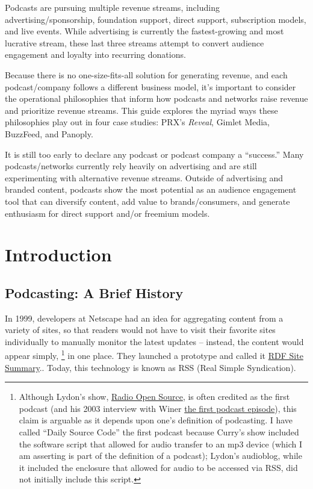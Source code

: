 \documentclass[notoc, symmetric, nobib, nols]{towcenter-guideto-book}
\begin{document}
Podcasts are pursuing multiple revenue streams, including advertising/sponsorship, foundation support, direct support, subscription models, and live events. While advertising is currently the fastest-growing and most lucrative stream, these last three streams attempt to convert audience engagement and loyalty into recurring donations. 

Because there is no one-size-fits-all solution for generating revenue, and each podcast/company follows a different business model, it's important to consider the operational philosophies that inform how podcasts and networks raise revenue and prioritize revenue streams. This guide explores the myriad ways these philosophies play out in four case studies: PRX's \textit{Reveal}, Gimlet Media, BuzzFeed, and Panoply. 

It is still too early to declare any podcast or podcast company a ``success.'' Many podcasts/networks currently rely heavily on advertising and are still experimenting with alternative revenue streams. Outside of advertising and branded content, podcasts show the most potential as an audience engagement tool that can diversify content, add value to brands/consumers, and generate enthusiasm for direct support and/or freemium models. 

\chapter{Introduction}

\section{Podcasting: A Brief History}

In 1999, developers at Netscape had an idea for aggregating content from a variety of sites, so that readers would not have to visit their favorite sites individually to manually monitor the latest updates -- instead, the content would appear simply, \footnote{Although Lydon’s show, \href{http://radioopensource.org/about/}{Radio Open Source}, is often credited as the first podcast (and his 2003 interview with Winer \href{http://blogs.harvard.edu/lydondev/2003/07/09/spoken-word-a-few-good-bloggers/}{the first podcast episode}), this claim is arguable as it depends upon one’s definition of podcasting. I have called ``Daily Source Code'' the first podcast because Curry’s show included the software script that allowed for audio transfer to an mp3 device (which I am asserting is part of the definition of a podcast); Lydon’s audioblog, while it included the enclosure that allowed for audio to be accessed via RSS, did not initially include this script.} in one place.\autocite{WhatisRSS} They launched a prototype and called it \href{https://en.wikipedia.org/wiki/RSS}{RDF Site Summary}.\autocite{RSSWiki}. Today, this technology is known as RSS (Real Simple Syndication). 
\end{document}
